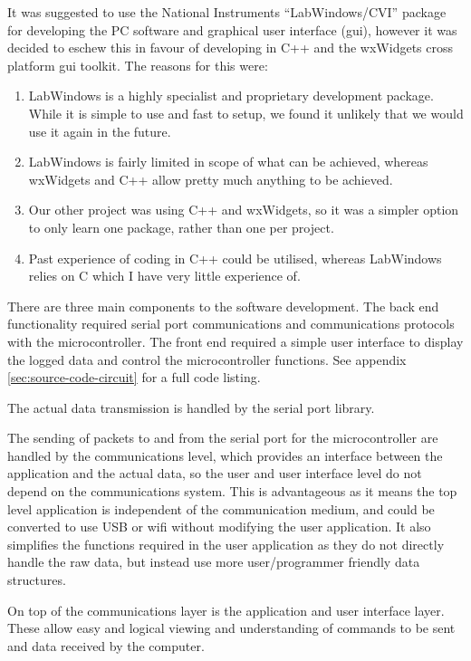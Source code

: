 \documentclass[a4paper,10pt]{article}  %
\begin{document}
It was suggested to use the National Instruments ``LabWindows/CVI''
package for developing the PC software and graphical user interface
(gui), however it was decided to eschew this in favour of developing
in C++ and the wxWidgets cross platform gui toolkit. The reasons for
this were:
\begin{enumerate}
\item LabWindows is a highly specialist and proprietary development
  package. While it is simple to use and fast to setup, we found it
  unlikely that we would use it again in the future.
\item LabWindows is fairly limited in scope of what can be achieved,
  whereas wxWidgets and C++ allow pretty much anything to be achieved.
\item Our other project was using C++ and wxWidgets, so it was a
  simpler option to only learn one package, rather than one per project.
\item Past experience of coding in C++ could be utilised, whereas
  LabWindows relies on C which I have very little experience of.
\end{enumerate}

There are three main components to the software development. The
back end functionality required serial port communications and
communications protocols with the microcontroller. The front end required a simple
user interface to display the logged data and control the
microcontroller functions. See appendix \ref{sec:source-code-circuit}
for a full code listing.

The actual data transmission is handled by the serial port
library.

The sending of packets to and from the serial port for the
microcontroller are handled by the communications level, which
provides an interface between the application and the actual data, so
the user and user interface level do not depend on the communications
system. This is advantageous as it means the top level application is
independent of the communication medium, and could be converted to use
USB or wifi without modifying the user application. It also simplifies
the functions required in the user application as they do not directly
handle the raw data, but instead use more user/programmer friendly
data structures.

On top of the communications layer is the application and user
interface layer. These allow easy and logical viewing and
understanding of commands to be sent and data received by the
computer.
\end{document}
